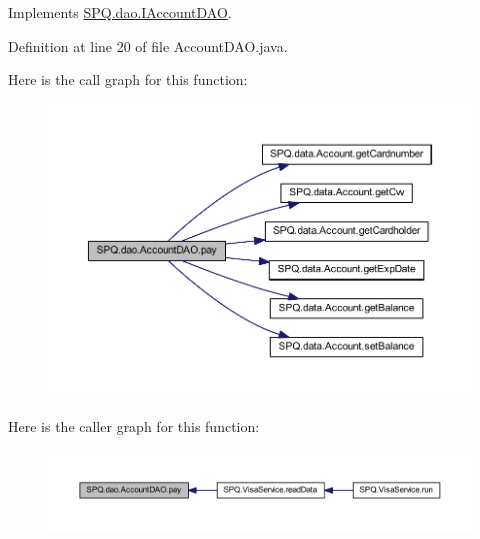 Implements \mbox{\hyperlink{interface_s_p_q_1_1dao_1_1_i_account_d_a_o_aa1e3f13d419f23fc0cb5c98cd4cc5eb4}{S\+P\+Q.\+dao.\+I\+Account\+D\+AO}}.



Definition at line 20 of file Account\+D\+A\+O.\+java.

Here is the call graph for this function\+:
\nopagebreak
\begin{figure}[H]
\begin{center}
\leavevmode
\includegraphics[width=350pt]{class_s_p_q_1_1dao_1_1_account_d_a_o_ad40cd6129f180d4cb235c00756b53930_cgraph}
\end{center}
\end{figure}
Here is the caller graph for this function\+:
\nopagebreak
\begin{figure}[H]
\begin{center}
\leavevmode
\includegraphics[width=350pt]{class_s_p_q_1_1dao_1_1_account_d_a_o_ad40cd6129f180d4cb235c00756b53930_icgraph}
\end{center}
\end{figure}
\mbox{\label{class_s_p_q_1_1dao_1_1_account_d_a_o_abe750b9b11a2c7d398c4d8676b053f99}} 
